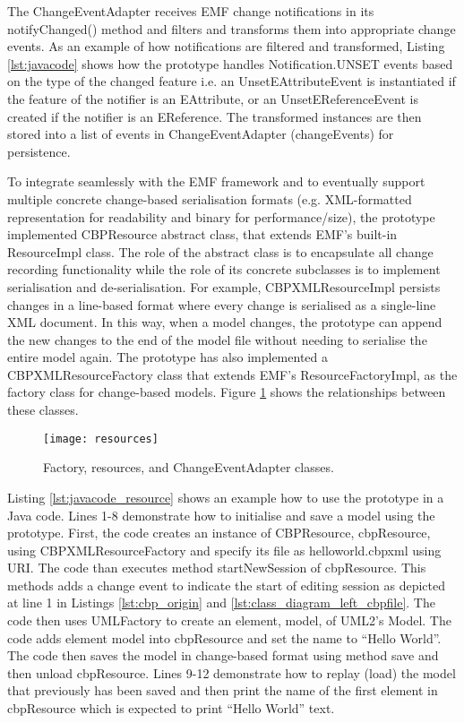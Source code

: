 The \textsf{ChangeEventAdapter} receives EMF change notifications in its \textsf{notifyChanged()} method and filters and transforms them into appropriate change events. As an example of how notifications are filtered and transformed, Listing \ref{lst:javacode} shows how the prototype handles \textsf{Notification.UNSET} events based on the type of the changed feature i.e. an \textsf{UnsetEAttributeEvent} is instantiated if the feature of the notifier is an \textsf{EAttribute}, or an \textsf{UnsetEReferenceEvent}  is created if the notifier is an \textsf{EReference}. The transformed instances are then stored into a list of events in \textsf{ChangeEventAdapter} (\textsf{changeEvents}) for persistence. 

To integrate seamlessly with the EMF framework and to eventually support multiple concrete change-based serialisation formats (e.g. XML-formatted representation for readability and binary for performance/size), the prototype implemented \textsf{CBPResource} abstract class, that extends EMF's built-in \textsf{ResourceImpl} class. The role of the abstract class is to encapsulate all change recording functionality while the role of its concrete subclasses is to implement serialisation and de-serialisation. For example, \textsf{CBPXMLResourceImpl} persists changes in a line-based format where every change is serialised as a single-line XML document. In this way, when a model changes, the prototype can append the new changes to the end of the model file without needing to serialise the entire model again. The prototype has also implemented a \textsf{CBPXMLResourceFactory} class that extends EMF's \textsf{ResourceFactoryImpl}, as the factory class for change-based models. Figure \ref{fig:resources} shows the relationships between these classes.

\begin{figure}[th]
    \centering
    \texttt{[image: resources]}
    \caption{Factory, resources, and ChangeEventAdapter classes.}
    \label{fig:resources}
\end{figure}

Listing \ref{lst:javacode_resource} shows an example how to use the prototype in a Java code. Lines 1-8 demonstrate how to initialise and save a model using the prototype. First, the code creates an instance of \textsf{CBPResource}, \textsf{cbpResource}, using \textsf{CBPXMLResourceFactory} and specify its file as \textsf{helloworld.cbpxml} using \textsf{URI}. The code than executes method \textsf{startNewSession} of \textsf{cbpResource}. This methods adds a change event to indicate the start of editing session as depicted at line 1 in Listings \ref{lst:cbp_origin} and \ref{lst:class_diagram_left_cbpfile}.
The code then uses \textsf{UMLFactory} to create an element, \textsf{model}, of UML2's \textsf{Model}. The code adds element \textsf{model} into \textsf{cbpResource} and set the name to ``Hello World''. The code then saves the model in change-based format using method \textsf{save} and then unload \textsf{cbpResource}. Lines 9-12 demonstrate how to replay (load) the model that previously has been saved and then print the name of the first element in \textsf{cbpResource} which is expected to print ``Hello World'' text.

